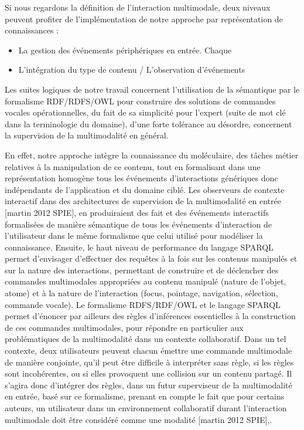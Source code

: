 Si nous regardons la définition de l'interaction multimodale, deux niveaux peuvent profiter de l'implémentation de notre approche par représentation de connaissances :

\begin{itemize}
	\item La gestion des événements périphériques en entrée. Chaque 
	\item L'intégration du type de contenu / L'observation d'événements
\end{itemize}

Les suites logiques de notre travail concernent l'utilisation de la sémantique par le formalisme RDF/RDFS/OWL pour construire des solutions de commandes vocales opérationnelles, du fait de sa simplicité pour l'expert (suite de mot clé dans la terminologie du domaine), d'une forte tolérance au désordre, concernent la supervision de la multimodalité en général.
 
En effet, notre approche intègre la connaissance du moléculaire, des tâches métier relatives à la manipulation de ce contenu, tout en formalisant dans une représentation homogène tous les événements d'interactions génériques donc indépendants de l'application et du domaine ciblé. Les observeurs de contexte interactif dans des architectures de supervision de la multimodalité en entrée [martin 2012 SPIE], en produiraient des fait et des événements interactifs formalisées de manière sémantique de tous les événements d'interaction de l'utilisateur dans le même formalisme que celui utilisé pour modéliser la connaissance. Ensuite, le haut niveau de performance du langage SPARQL permet d'envisager d'effectuer des requêtes à la fois sur les contenus manipulés et sur la nature des interactions, permettant de construire et de déclencher des commandes multimodales appropriées au contenu manipulé (nature de l'objet, atome) et à la nature de l'interaction (focus, pointage, navigation, sélection, commande vocale). Le formalisme RDFS/RDF/OWL et le langage SPARQL permet d'énoncer par ailleurs des règles d'inférences essentielles à la construction de ces commandes multimodales, pour répondre en particulier aux problématiques de la multimodalité dans un contexte collaboratif. 
Dans un tel contexte, deux utilisateurs peuvent chacun émettre une commande multimodale de manière conjointe, qu'il peut être difficile à interpréter sans règle, si les règles sont incohérentes, ou si elles provoquent une collision sur un contenu partagé. Il s'agira donc d'intégrer des règles, dans un futur superviseur de la multimodalité en entrée, basé sur ce formalisme, prenant en compte le fait que pour certains auteurs, un utilisateur dans un environnement collaboratif durant l'interaction multimodale doit être considéré comme une modalité [martin 2012 SPIE],.



